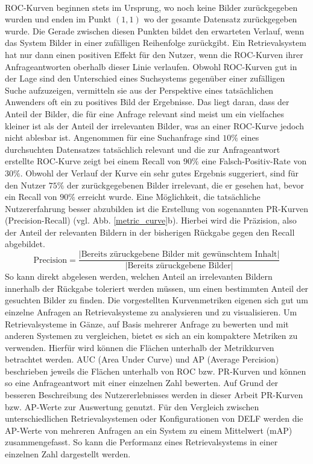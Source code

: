 \\
ROC-Kurven beginnen stets im Ursprung, wo noch keine Bilder zurückgegeben wurden und enden im Punkt $(1,1)$ wo der gesamte Datensatz zurückgegeben wurde. Die Gerade zwischen diesen Punkten bildet den erwarteten Verlauf, wenn das System Bilder in einer zufälligen Reihenfolge zurückgibt. Ein Retrievalsystem hat nur dann einen positiven Effekt für den Nutzer, wenn die ROC-Kurven ihrer Anfrageantworten oberhalb dieser Linie verlaufen. Obwohl ROC-Kurven gut in der Lage sind den Unterschied eines Suchsystems gegenüber einer zufälligen Suche aufzuzeigen, vermitteln sie aus der Perspektive eines tatsächlichen Anwenders oft ein zu positives Bild der Ergebnisse. Das liegt daran, dass der Anteil der Bilder, die für eine Anfrage relevant sind meist um ein vielfaches kleiner ist als der Anteil der irrelevanten Bilder, was an einer ROC-Kurve jedoch nicht ablesbar ist. Angenommen für eine Suchanfrage sind $10\%$ eines durchsuchten Datensatzes tatsächlich relevant und die zur Anfrageantwort erstellte ROC-Kurve zeigt bei einem Recall von $90\%$ eine Falsch-Positiv-Rate von $30\%$. Obwohl der Verlauf der Kurve ein sehr gutes Ergebnis suggeriert, sind für den Nutzer $75\%$ der zurückgegebenen Bilder irrelevant, die er gesehen hat, bevor ein Recall von $90\%$ erreicht wurde. Eine Möglichkeit, die tatsächliche Nutzererfahrung besser abzubilden ist die Erstellung von sogenannten PR-Kurven (Precision-Recall) (vgl. Abb. \ref{metric_curve}b). Hierbei wird die Präzision, also der Anteil der relevanten Bildern in der bisherigen Rückgabe gegen den Recall abgebildet.
\begin{equation}
\text{Precision} = \frac{|\text{Bereits züruckgebene Bilder mit gewünschtem Inhalt}|}{|\text{Bereits züruckgebene Bilder}|}
\end{equation}
So kann direkt abgelesen werden, welchen Anteil an irrelevanten Bildern innerhalb der Rückgabe toleriert werden müssen, um einen bestimmten Anteil der gesuchten Bilder zu finden.
Die vorgestellten Kurvenmetriken eigenen sich gut um einzelne Anfragen an Retrievalsysteme zu analysieren und zu visualisieren. Um Retrievalsysteme in Gänze, auf Basis mehrerer Anfrage zu bewerten und mit anderen Systemen zu vergleichen, bietet es sich an ein kompaktere Metriken zu verwenden. Hierfür wird können die Flächen unterhalb der Metrikkurven betrachtet werden. AUC (Area Under Curve) und AP (Average Percision) beschrieben jeweils die Flächen unterhalb von ROC bzw. PR-Kurven und können so eine Anfrageantwort mit einer einzelnen Zahl bewerten. Auf Grund der besseren Beschreibung des Nutzererlebnisses werden in dieser Arbeit PR-Kurven bzw. AP-Werte zur Auswertung genutzt. Für den Vergleich zwischen unterschiedlichen Retrievalsystemen oder Konfigurationen von DELF werden die AP-Werte von mehreren Anfragen an ein System zu einem Mittelwert (mAP) zusammengefasst. So kann die Performanz eines Retrievalsystems in einer einzelnen Zahl dargestellt werden. 
 

